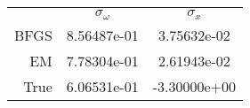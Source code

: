 \begin{tabular}{rSS}
\toprule
&&\\\otoprule
BFGS&8.56487e-01&3.75632e-02\\
EM&7.78304e-01&2.61943e-02\\
True&6.06531e-01&-3.30000e+00\\
\bottomrule\end{tabular}
